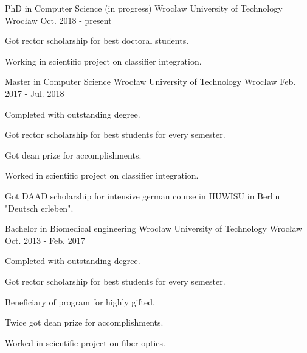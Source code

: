 
\begin{cventries}

    \cventry
    {PhD in Computer Science (in progress)}
    {Wrocław University of Technology}
    {Wrocław}
    {Oct. 2018 - present}
    {
    \begin{cvitems}
        \item {Got rector scholarship for best doctoral students.}
        \item {Working in scientific project on classifier integration.}
    \end{cvitems}
    }

    \cventry
    {Master in Computer Science}
    {Wrocław University of Technology}
    {Wrocław}
    {Feb. 2017 - Jul. 2018}
    {
    \begin{cvitems}
        \item {Completed with outstanding degree.}
        \item {Got rector scholarship for best students for every semester.}
        \item {Got dean prize for accomplishments.}
        \item {Worked in scientific project on classifier integration.}
        \item {Got DAAD scholarship for intensive german course in HUWISU in Berlin "Deutsch erleben".}
    \end{cvitems}
    }

    \cventry
    {Bachelor in Biomedical engineering}
    {Wrocław University of Technology}
    {Wrocław}
    {Oct. 2013 - Feb. 2017}
    {
    \begin{cvitems}
        \item {Completed with outstanding degree.}
        \item {Got rector scholarship for best students for every semester.}
        \item {Beneficiary of program for highly gifted.}
        \item {Twice got dean prize for accomplishments.}
        \item {Worked in scientific project on fiber optics.}
    \end{cvitems}
    }

\end{cventries}
